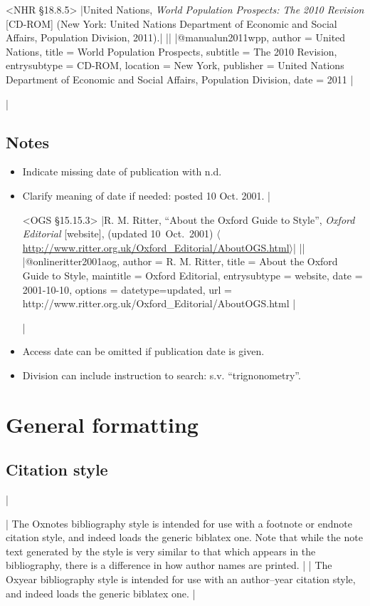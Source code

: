 \documentclass[extrafontsizes,11pt,a4paper,oneside]{memoir}
\begin{document}
\bibexample<NHR \S18.8.5>
|United Nations, \emph{World Population Prospects: The 2010 Revision} [CD-ROM] (New York: United Nations Department of Economic and Social Affairs, Population Division, 2011).|%
||%
|@manual{un2011wpp,
  author = {{United Nations}},
  title = {World Population Prospects},
  subtitle = {The 2010 Revision},
  entrysubtype = {CD-ROM},
  location = {New York},
  publisher = {United Nations Department of Economic and Social Affairs, Population Division},
  date = {2011}
}|

\todoc|
\section{Notes}

\begin{itemize}
  \item Indicate missing date of publication with n.d.
  \item Clarify meaning of date if needed: posted 10 Oct. 2001.
|  

\bibexample<OGS \S15.15.3>
|R. M. Ritter, \enquote{About the Oxford Guide to Style}, \emph{Oxford Editorial} [website], (updated 10~Oct.\ 2001) $\langle$\url{http://www.ritter.org.uk/Oxford_Editorial/AboutOGS.html}$\rangle$|%
||%
|@online{ritter2001aog,
  author = {R. M. Ritter},
  title = {About the Oxford Guide to Style},
  maintitle = {Oxford Editorial},
  entrysubtype = {website},
  date = {2001-10-10},
  options = {datetype=updated},
  url = {http://www.ritter.org.uk/Oxford_Editorial/AboutOGS.html}
}|

\todoc|  
  \item Access date can be omitted if publication date is given.
  \item Division can include instruction to search: s.v. \enquote{trignonometry}.
\end{itemize}

\chapter{General formatting}

\section{Citation style}
|

\todoc[oxnotes]|
The Oxnotes bibliography style is intended for use with a footnote or endnote citation style,
and indeed loads the generic \textsf{biblatex} one.
Note that while the note text generated by the style is very similar to that which appears in the bibliography,
there is a difference in how author names are printed.
|
\todoc[oxnotes]|
The Oxyear bibliography style is intended for use with an author–year citation style,
and indeed loads the generic \textsf{biblatex} one.
|
\end{document}
